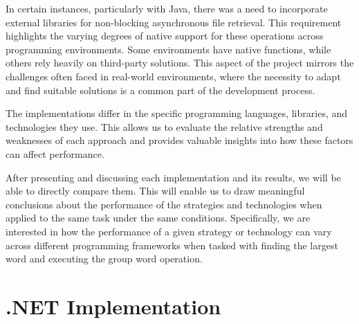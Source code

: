 In certain instances, particularly with Java, there was a need to incorporate external libraries for non-blocking asynchronous file retrieval. This requirement highlights the varying degrees of native support for these operations across programming environments. Some environments have native functions, while others rely heavily on third-party solutions. This aspect of the project mirrors the challenges often faced in real-world environments, where the necessity to adapt and find suitable solutions is a common part of the development process.

The implementations differ in the specific programming languages, libraries, and technologies they use. This allows us to evaluate the relative strengths and weaknesses of each approach and provides valuable insights into how these factors can affect performance.

After presenting and discussing each implementation and its results, we will be able to directly compare them. This will enable us to draw meaningful conclusions about the performance of the strategies and technologies when applied to the same task under the same conditions. Specifically, we are interested in how the performance of a given strategy or technology can vary across different programming frameworks when tasked with finding the largest word and executing the group word operation.

\section{.NET Implementation}
\label{sec:dotnet_implementation}
\begin{table}[h!]
    \centering
    \caption{Processing times for different strategies for "Count Words".}
    \label{tab:strategies_times_count_words}
\end{table}

